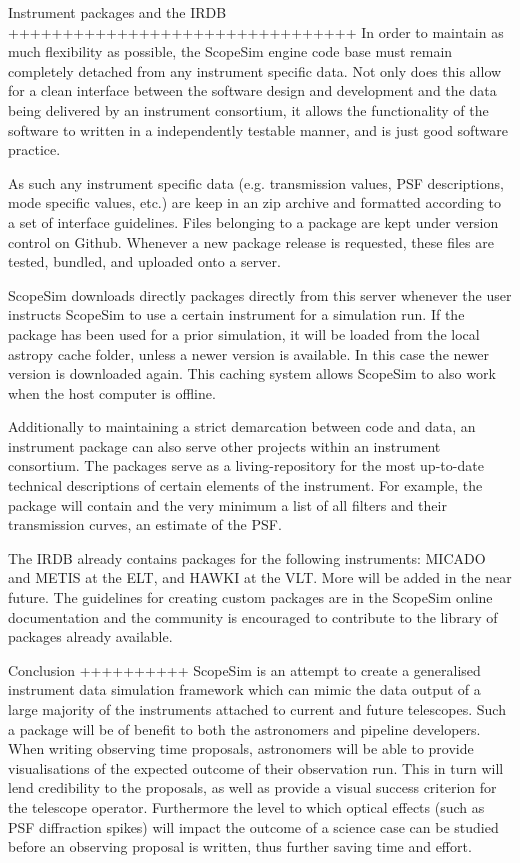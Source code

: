 Instrument packages and the IRDB
++++++++++++++++++++++++++++++++
In order to maintain as much flexibility as possible, the ScopeSim engine
code base must remain completely detached from any instrument specific data.
Not only does this allow for a clean interface between the software design and
development and the data being delivered by an instrument consortium, it
allows the functionality of the software to written in a independently testable
manner, and is just good software practice.

As such any instrument specific data (e.g. transmission values, PSF
descriptions, mode specific values, etc.) are keep in an zip archive and
formatted according to a set of interface guidelines. Files belonging to a
package are kept under version control on Github. Whenever a new package release
is requested, these files are tested, bundled, and uploaded onto a server.

ScopeSim downloads directly packages directly from this server whenever the user
instructs ScopeSim to use a certain instrument for a simulation run. If the
package has been used for a prior simulation, it will be loaded from the local
astropy cache folder, unless a newer version is available. In this case the
newer version is downloaded again. This caching system allows ScopeSim to also
work when the host computer is offline.

Additionally to maintaining a strict demarcation between code and data, an
instrument package can also serve other projects within an instrument
consortium. The packages serve as a living-repository for the most up-to-date
technical descriptions of certain elements of the instrument. For example, the
package will contain and the very minimum a list of all filters and their
transmission curves, an estimate of the PSF.

The IRDB already contains packages for the following instruments: MICADO and
METIS at the ELT, and HAWKI at the VLT. More will be added in the near future.
The guidelines for creating custom packages are in the ScopeSim online
documentation and the community is encouraged to contribute to the library of
packages already available.


Conclusion
++++++++++
ScopeSim is an attempt to create a generalised instrument data simulation
framework which can mimic the data output of a large majority of the instruments
attached to current and future telescopes. Such a package will be of benefit to
both the astronomers and pipeline developers. When writing observing
time proposals, astronomers will be able to provide visualisations of the
expected outcome of their observation run. This in turn will lend credibility
to the proposals, as well as provide a visual success criterion for the
telescope operator. Furthermore the level to which optical effects (such as PSF
diffraction spikes) will impact the outcome of a science case can be studied
before an observing proposal is written, thus further saving time and effort.
